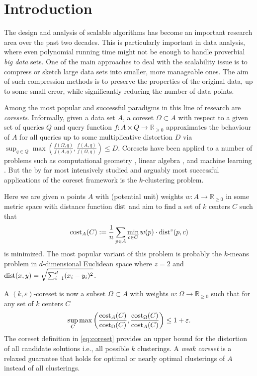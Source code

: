 \section{Introduction}

The design and analysis of scalable algorithms has become an important research area over the past two decades. This is particularly important in data analysis, where even polynomial running time might not be enough to handle proverbial \emph{big data} sets.
One of the main approaches to deal with the scalability issue is to compress or sketch large data sets into smaller, more manageable ones. The aim of such compression methods is to preserve the properties of the original data, up to some small error, while significantly reducing the number of data points.

Among the most popular and successful paradigms in this line of research are \emph{coresets}. Informally, given a data set $A$, a coreset $\Omega \subset A$ with respect to a given set of queries $Q$ and query function $f: A\times Q \rightarrow \mathbb{R}_{\geq 0}$ approximates the behaviour of $A$ for all queries up to some multiplicative distortion $D$ via $\sup_{q\in Q} \max\left( \frac{f(\Omega,q)}{f(A,q)},\frac{f(A,q)}{f(\Omega,q)}\right) \leq D.$
Coresets have been applied to a number of problems such as computational geometry \cite{AHV05,Chan09}, linear algebra \cite{IndykMGR20,maalouf2019fast}, and machine learning \cite{MRM21,MunteanuSSW18}. But the by far most intensively studied and arguably most successful applications of the coreset framework is the $k$-clustering problem.

Here we are given $n$ points $A$ with (potential unit) weights $w:A\rightarrow \mathbb{R}_{\geq 0}$ in some metric space with distance function $\text{dist}$ and aim to find a set of $k$ centers $C$ such that 
\begin{equation*}
\text{cost}_A(C):= \frac{1}{n} \sum_{p\in A}  \min_{c\in C} w(p)\cdot \text{dist}^z(p,c)
\end{equation*}
is minimized. The most popular variant of this problem is probably the $k$-means problem in $d$-dimensional Euclidean space where $z=2$ and $\text{dist}(x,y) = \sqrt{\sum_{i=1}^d (x_i-y_i)^2}$.

A $(k,\varepsilon)$-coreset is now a subset $\Omega\subset A$ with weights $w:\Omega\rightarrow \mathbb{R}_{\geq 0}$ such that for any set of $k$ centers $C$
\begin{equation}
\label{eq:coreset}
\sup_{C} \max\left( \frac{\text{cost}_A(C)}{\text{cost}_{\Omega}(C)},\frac{\text{cost}_{\Omega}(C)}{\text{cost}_{A}(C)}\right) \leq 1+\varepsilon.
\end{equation}
The coreset definition in \cref{eq:coreset} provides an upper bound for the distortion of all candidate solutions i.e., all possible $k$ clusterings. 
A \emph{weak coreset} is a relaxed guarantee that holds for optimal or nearly optimal clusterings of $A$ instead of all clusterings.

